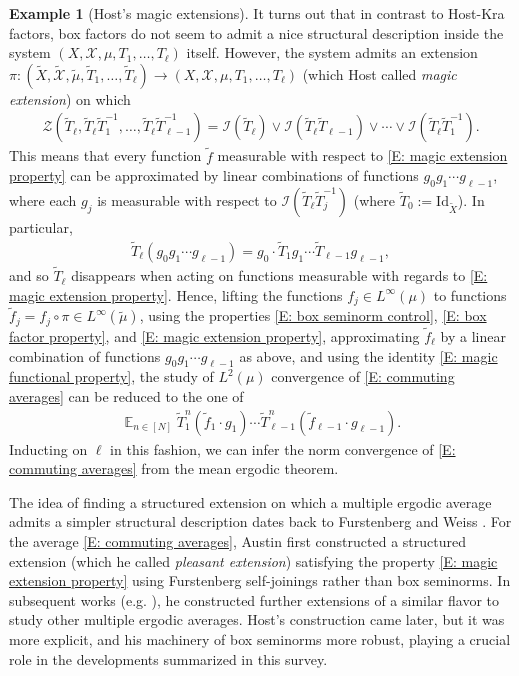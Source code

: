 \documentclass[11pt]{amsart}
\theoremstyle{definition}
\newtheorem{example}[lemma]{Example}
\DeclareMathOperator*{\E}{\mathbb{E}}
\newcommand{\CI}{{\mathcal I}}
\newcommand{\CX}{{\mathcal X}}
\newcommand{\CZ}{{\mathcal Z}}
\newcommand{\Id}{\textrm{Id}}
\newcommand{\inv}{^{-1}}
\newcommand{\1}{{\mathbf{1}}}
\begin{document}
\begin{example}[Host's magic extensions]
It turns out that in contrast to Host-Kra factors, box factors do not seem to admit a nice structural description inside the system $(X, \CX,\mu, T_1, \ldots, T_\ell)$ itself. However, the system admits an extension $\pi:(\widetilde X, \widetilde\CX,\widetilde\mu, \widetilde T_1, \ldots, \widetilde T_\ell)\to (X, \CX,\mu, T_1, \ldots, T_\ell)$ (which Host called \emph{magic extension}) on which
\begin{align}\label{E: magic extension property}
    \CZ(\widetilde T_\ell, \widetilde T_\ell \widetilde T_1\inv, \ldots, \widetilde T_\ell \widetilde T_{\ell-1}\inv) = \CI(\widetilde T_\ell)\vee \CI(\widetilde T_\ell \widetilde T_{\ell-1}) \vee \cdots \vee \CI(\widetilde T_\ell \widetilde T_1\inv).
\end{align}
This means that every function $\widetilde f$ measurable with respect to \eqref{E: magic extension property} can be approximated by linear combinations of functions $g_0 g_1 \cdots g_{\ell-1}$, where each $g_j$ is measurable with respect to $\CI(\widetilde T_\ell \widetilde T_j\inv)$ (where $\widetilde T_0 := \Id_{\widetilde X}$). 
In particular,
\begin{align}\label{E: magic functional property}
    \widetilde T_\ell (g_0 g_1 \cdots g_{\ell-1}) = g_0 \cdot \widetilde T_1 g_1\cdots \widetilde T_{\ell-1}g_{\ell-1},
\end{align}
and so $\widetilde T_\ell$ disappears when acting on functions measurable with regards to \eqref{E: magic extension property}.
Hence, lifting the functions $f_j\in L^\infty(\mu)$ to functions $\widetilde f_j = f_j\circ \pi\in L^\infty(\widetilde \mu)$, using the properties \eqref{E: box seminorm control}, \eqref{E: box factor property}, and \eqref{E: magic extension property}, approximating $\widetilde f_\ell$ by a linear combination of functions $g_0 g_1 \cdots g_{\ell-1}$ as above, and using the identity \eqref{E: magic functional property}, the study of $L^2(\mu)$ convergence of \eqref{E: commuting averages} can be reduced to the one of 
\begin{align*}
        \E_{n\in[N]} \widetilde T_1^n (\widetilde f_1 \cdot g_1) \cdots \widetilde T_{\ell-1}^n (\widetilde f_{\ell-1} \cdot g_{\ell-1}).
\end{align*}
Inducting on $\ell$ in this fashion, we can infer the norm convergence of \eqref{E: commuting averages} from the mean ergodic theorem.

The idea of finding a structured extension on which a multiple ergodic average admits a simpler structural description dates back to Furstenberg and Weiss \cite{FW96}. For the average \eqref{E: commuting averages}, Austin \cite{A10b} first constructed a structured extension (which he called \emph{pleasant extension}) satisfying the property \eqref{E: magic extension property} using Furstenberg self-joinings rather than box seminorms. In subsequent works (e.g. \cite{A15a, A15b}), he constructed further extensions of a similar flavor to study other multiple ergodic averages. Host's construction came later, but it was more explicit, and his machinery of box seminorms more robust, playing a crucial role in the developments summarized in this survey.
\end{example}
\end{document}
